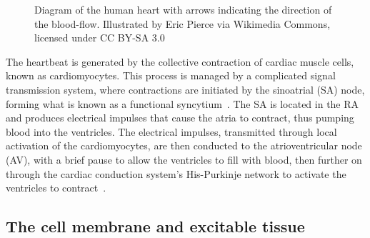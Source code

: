 \begin{figure}[H]
    \centering
    
    \caption{Diagram of the human heart with arrows indicating the direction of the blood-flow. Illustrated by Eric Pierce via Wikimedia Commons, licensed under CC BY-SA 3.0}
    \label{fig:heart_illustration}
\end{figure}

The heartbeat is generated by the collective contraction of cardiac muscle cells, known as cardiomyocytes. This process is managed by a complicated signal transmission system, where contractions are initiated by the sinoatrial (SA) node, forming what is known as a functional syncytium~\cite{2006Ctea}. The SA is located in the RA and produces electrical impulses that cause the atria to contract, thus pumping blood into the ventricles. The electrical impulses, transmitted through local activation of the cardiomyocytes, are then conducted to the atrioventricular node (AV), with a brief pause to allow the ventricles to fill with blood, then further on through the cardiac conduction system's His-Purkinje network to activate the ventricles to contract~\cite{HallJohnE2011GaHt}.

\subsection{The cell membrane and excitable tissue}


